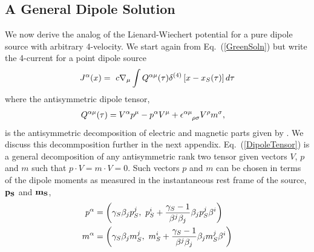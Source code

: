 \subsection{A General Dipole Solution}
We now derive the analog of the Lienard-Wiechert potential for a pure dipole source with arbitrary 4-velocity. We start again from Eq.\ (\ref{GreenSoln}) but write the 4-current for a point dipole source
\begin{align}
J^{\alpha}({x}) =  \hbox{  } c \nabla_{\mu} \int { Q^{\alpha \mu}(\tau) \delta^{(4)}\left[ {x} -{x_S}(\tau) \right]   d \tau}
\label{eq:4JDipole}
\end{align}
where the antisymmetric dipole tensor, 
\begin{align}
Q^{\alpha \mu}(\tau) &= V^{\alpha}p^{\mu} - p^{\alpha}V^{\mu} + \epsilon^{\alpha \mu}_{ \hbox{  } \hbox{  } \hbox{  }\rho \sigma} V^{\rho} m^{\sigma},
\label{DipoleTensor}
\end{align}
is the antisymmetric decomposition of electric and magnetic
parts given by
\cite{RS:1995}. We discuss this decommposition further in the next
appendix. Eq.\ (\ref{DipoleTensor}) is a general decomposition
of any antisymmetric rank two tensor given vectors $V$, $p$ and $m$
such that $p \cdot V = m \cdot V =0$. Such vectors $p$ and $m$ can be
chosen in terms of the dipole moments as measured in the instantaneous
rest frame of the source, $\bf{p_S}$ and $\bf{m_S}$,
\begin{align}
p^{\alpha}&= \left(\gamma_S \beta_j {p^j_S}, \hbox{ } {p^i_S} + \frac{\gamma_S-1}{\beta^j \beta_j} \beta_j {p^j_S} \beta^i \right)  \nonumber \\
m^{\alpha}&= \left( \gamma_S \beta_j {m^j_S}, \hbox{ } {m^i_S} + \frac{\gamma_S-1}{\beta^j \beta_j} \beta_j {m^j_S}  \beta^i \right)
\label{App:4Moments}
\end{align}

